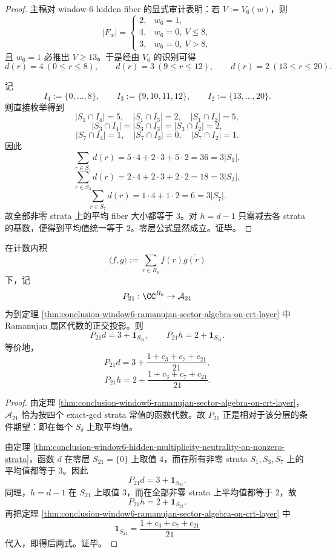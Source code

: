 \begin{proof}
主稿对 window-\(6\) hidden fiber 的显式审计表明：若 \(V:=V_6(w)\)，则
\[
|F_w|=
\begin{cases}
2,& w_6=1,\\
4,& w_6=0,\ V\le 8,\\
3,& w_6=0,\ V>8,
\end{cases}
\]
且 \(w_6=1\) 必推出 \(V\ge 13\)。于是经由 \(V_6\) 的识别可得
\[
d(r)=4\ (0\le r\le 8),\qquad
d(r)=3\ (9\le r\le 12),\qquad
d(r)=2\ (13\le r\le 20).
\]

记
\[
I_4:=\{0,\dots,8\},\qquad
I_3:=\{9,10,11,12\},\qquad
I_2:=\{13,\dots,20\}.
\]
则直接枚举得到
\[
|S_1\cap I_4|=5,\quad |S_1\cap I_3|=2,\quad |S_1\cap I_2|=5,
\]
\[
|S_3\cap I_4|=|S_3\cap I_3|=|S_3\cap I_2|=2,
\]
\[
|S_7\cap I_4|=1,\quad |S_7\cap I_3|=0,\quad |S_7\cap I_2|=1.
\]
因此
\[
\sum_{r\in S_1}d(r)=5\cdot 4+2\cdot 3+5\cdot 2=36=3|S_1|,
\]
\[
\sum_{r\in S_3}d(r)=2\cdot 4+2\cdot 3+2\cdot 2=18=3|S_3|,
\]
\[
\sum_{r\in S_7}d(r)=1\cdot 4+1\cdot 2=6=3|S_7|.
\]
故全部非零 strata 上的平均 fiber 大小都等于 \(3\)。对 \(h=d-1\) 只需减去各 strata 的基数，便得到平均值统一等于 \(2\)。零层公式显然成立。证毕。
\end{proof}

\begin{theorem}\label{thm:conclusion-window6-hidden-rank-ramanujan-visible-orthogonal-projection}
在计数内积
\[
\langle f,g\rangle:=\sum_{r\in R_6}f(r)\overline{g(r)}
\]
下，记
\[
P_{21}:\CC^{R_6}\to \mathcal A_{21}
\]
为到定理 \ref{thm:conclusion-window6-ramanujan-sector-algebra-on-crt-layer} 中 Ramanujan 扇区代数的正交投影。则
\[
P_{21}d=3+\mathbf 1_{S_{21}},
\qquad
P_{21}h=2+\mathbf 1_{S_{21}}.
\]
等价地，
\[
P_{21}d
=
3+\frac{1+c_3+c_7+c_{21}}{21},
\]
\[
P_{21}h
=
2+\frac{1+c_3+c_7+c_{21}}{21}.
\]
\end{theorem}

\begin{proof}
由定理 \ref{thm:conclusion-window6-ramanujan-sector-algebra-on-crt-layer}，\(\mathcal A_{21}\) 恰为按四个 exact-gcd strata 常值的函数代数。故 \(P_{21}\) 正是相对于该分层的条件期望：即在每个 \(S_\delta\) 上取平均值。

由定理 \ref{thm:conclusion-window6-hidden-multiplicity-neutrality-on-nonzero-strata}，函数 \(d\) 在零层 \(S_{21}=\{0\}\) 上取值 \(4\)，而在所有非零 strata \(S_1,S_3,S_7\) 上的平均值都等于 \(3\)。因此
\[
P_{21}d=3+\mathbf 1_{S_{21}}.
\]
同理，\(h=d-1\) 在 \(S_{21}\) 上取值 \(3\)，而在全部非零 strata 上平均值都等于 \(2\)，故
\[
P_{21}h=2+\mathbf 1_{S_{21}}.
\]
再把定理 \ref{thm:conclusion-window6-ramanujan-sector-algebra-on-crt-layer} 中
\[
\mathbf 1_{S_{21}}=\frac{1+c_3+c_7+c_{21}}{21}
\]
代入，即得后两式。证毕。
\end{proof}

